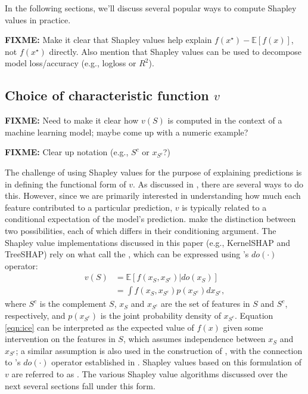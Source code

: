 In the following sections, we'll discuss several popular ways to compute
Shapley values in practice.

\textbf{FIXME:} Make it clear that Shapley values help explain
\(f\left(x^\star\right) - \mathbb{E}\left[f\left(x\right)\right]\), not
\(f\left(x^\star\right)\) directly. Also mention that Shapley values can
be used to decompose model loss/accuracy (e.g., logloss or \(R^2\)).

\subsection{Choice of characteristic function $v$}

\textbf{FIXME:} Need to make it clear how \(v\left(S\right)\) is
computed in the context of a machine learning model; maybe come up with
a numeric example?

\textbf{FIXME:} Clear up notation (e.g., \(S^c\) or \(x_{S^c}\)?)

The challenge of using Shapley values for the purpose of explaining
predictions is in defining the functional form of \(v\). As discussed in
\citet{chen-2020-true}, there are several ways to do this. However,
since we are primarily interested in understanding how much each feature
contributed to a particular prediction, \(v\) is typically related to a
conditional expectation of the model's prediction.
\citet{chen-2020-true} make the distinction between two possibilities,
each of which differs in their conditioning argument. The Shapley value
implementations discussed in this paper (e.g., KernelSHAP and TreeSHAP)
rely on what \citet{chen-2020-true} call the
, which can be expressed
using \citeauthor{pearl-2009-causality}'s
\citeyearpar{pearl-2009-causality} \(do\left(\cdot\right)\) operator:
\begin{equation}
\label{eqn:ice}
\begin{split}
  v\left(S\right) &= \mathbb{E}\left[f\left(x_S, x_{S^c}\right) | do\left(x_S\right)\right] \\
                  &= \int f\left(x_S, x_{S^c}\right) p\left(x_{S^c}\right) d x_{S^c},
\end{split}
\end{equation} where \(S^c\) is the complement \(S\), \(x_S\) and
\(x_{S^c}\) are the set of features in \(S\) and \(S^c\), respectively,
and \(p\left(x_{S^c}\right)\) is the joint probability density of
\(x_{S^c}\). Equation \eqref{eqn:ice} can be interpreted as the expected
value of \(f\left(x\right)\) given some intervention on the features in
\(S\), which assumes independence between \(x_S\) and \(x_{S^c}\); a
similar assumption is also used in the construction of
 \citep{friedman-2001-greedy}, with the
connection to \citeauthor{pearl-2009-causality}'s
\citeyearpar{pearl-2009-causality} \(do\left(\cdot\right)\) operator
established in \citet{zhao-2021-causal}. Shapley values based on this
formulation of \(v\) are referred to as
 \citep{chen-2020-true}. The various
Shapley value algorithms discussed over the next several sections fall
under this form.

